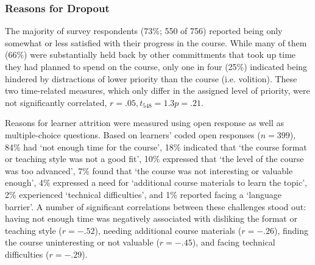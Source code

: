 \documentclass{sigchi}\usepackage[]{graphicx}\usepackage[]{color}
\begin{document}


\subsubsection{Reasons for Dropout}

The majority of survey respondents (73\%; 550 of 756) reported being only somewhat or less satisfied with their progress in the course. While many of them (66\%) were substantially held back by other committments that took up time they had planned to spend on the course, only one in four (25\%) indicated being hindered by distractions of lower priority than the course (i.e. volition). These two time-related measures, which only differ in the assigned level of priority, were not significantly correlated, $r=.05, t_{548}=1.3 p=.21$.

Reasons for learner attrition were measured using open response as well as multiple-choice questions. Based on learners' coded open responses ($n=399$), 84\% had `not enough time for the course', 18\% indicated that `the course format or teaching style was not a good fit', 10\% expressed that `the level of the course was too advanced', 7\% found that `the course was not interesting or valuable enough', 4\% expressed a need for `additional course materials to learn the topic', 2\% experienced `technical difficulties', and 1\% reported facing a `language barrier'. A number of significant correlations between these challenges stood out: having not enough time was negatively associated with disliking the format or teaching style ($r=-.52$), needing additional course materials ($r=-.26$), finding the course uninteresting or not valuable ($r=-.45$), and facing technical difficulties ($r=-.29$). 
\end{document}
